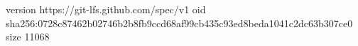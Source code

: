 version https://git-lfs.github.com/spec/v1
oid sha256:0728c87462b02746b2b8fb9ccd68af99cb435c93ed8beda1041c2dc63b307ce0
size 11068
